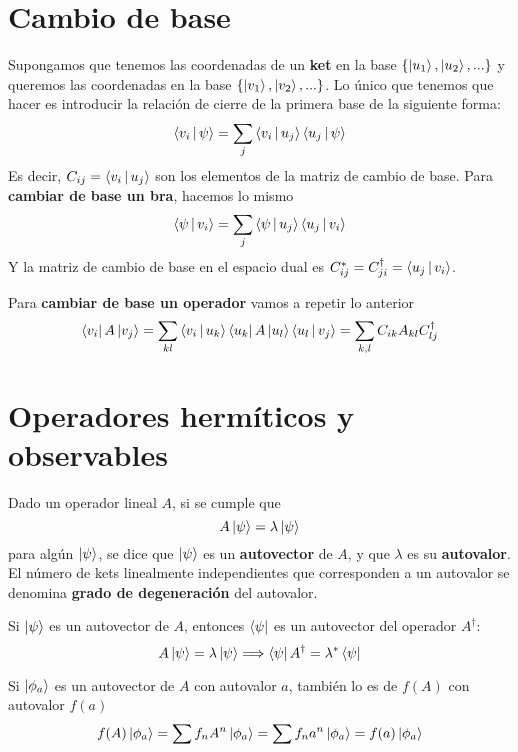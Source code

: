 \documentclass[12pt]{report}
\begin{document}
\section{Cambio de base}
Supongamos que tenemos las coordenadas de un \textbf{ket} en la base $\left\{ \ket{u_{1}},\ket{u_{2}},...\right\}$ y queremos las coordenadas en la base  $\left\{ \ket{v_{1}},\ket{v_{2}},...\right\}$. Lo único que tenemos que hacer es introducir la relación de cierre de la primera base de la siguiente forma:
\begin{equation}
 \Braket{v_{i}|\psi}=\sum_{j}\Braket{v_{i}|u_{j}}\Braket{u_{j}|\psi}
\end{equation}
Es decir, $C_{ij}=\Braket{v_{i}|u_{j}}$ son los elementos de la matriz de cambio de base. Para \textbf{cambiar de base un bra}, hacemos lo mismo
 \begin{equation}
	\Braket{\psi |v_{i}}=\sum_{j}\Braket{\psi |u_{j}}\Braket{u_{j}|v_{i}}
\end{equation}
Y la matriz de cambio de base en el espacio dual es $C_{ij}^{\ast}=C_{ji}^{\dagger}=\Braket{u_{j}|v_{i}}$.

Para \textbf{cambiar de base un operador} vamos a repetir lo anterior
\begin{equation}
	\bra{v_{i}}A\ket{v_{j}}=\sum_{kl}\Braket{v_{i}|u_{k}}\bra{u_{k}}A\ket{u_{l}}\Braket{u_{l}|v_{j}}=\sum_{k,l}C_{ik}A_{kl}C_{lj}^{\dagger}
\end{equation}

\section{Operadores hermíticos y observables}
Dado un operador lineal $A$, si se cumple que
\begin{equation}
	A\ket{\psi }=\lambda\ket{\psi }
\end{equation}
para algún $\ket{\psi }$, se dice que $\ket{\psi }$ es un \textbf{autovector} de $A$, y que $\lambda $ es su \textbf{autovalor}. El número de kets linealmente independientes que corresponden a un autovalor se denomina \textbf{grado de degeneración} del autovalor.

Si $\ket{\psi }$ es un autovector de $A$, entonces $\bra{\psi }$ es un autovector del operador $A^{\dagger}$:
\begin{equation}
	A\ket{\psi }=\lambda\ket{\psi }\Longrightarrow \bra{\psi }A^{\dagger}=\lambda^{\ast}\bra{\psi}
\end{equation}

Si $\ket{\phi_a}$ es un autovector de $A$ con autovalor $a$, también lo es de $f(A)$ con autovalor $f(a)$
\begin{equation}
    f(A)\ket{\phi_a}=\sum f_n A^n \ket{\phi_a}=\sum f_n a^n\ket{\phi_a}=f(a)\ket{\phi_a}
\end{equation}
\end{document}
